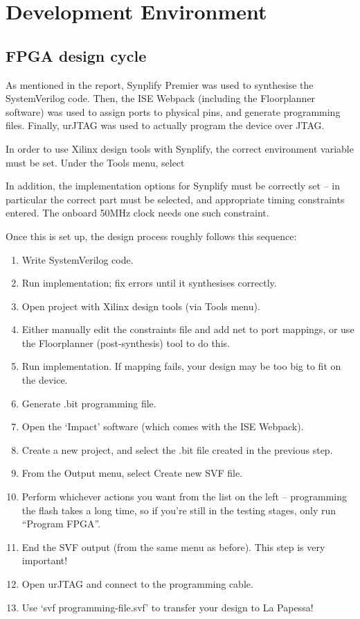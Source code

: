 \chapter{Development Environment} %
\label{apdx:development_environment}


\section{FPGA design cycle} %
\label{apdx:fpga_design_cycle}
	As mentioned in the report, Synplify Premier was used to synthesise the SystemVerilog code.  Then, the ISE Webpack (including the Floorplanner software) was used to assign ports to physical pins, and generate programming files.  Finally, urJTAG was used to actually program the device over JTAG.

	In order to use Xilinx design tools with Synplify, the correct environment variable must be set.  Under the Tools menu, select %

	In addition, the implementation options for Synplify must be correctly set -- in particular the correct part must be selected, and appropriate timing constraints entered.  The onboard 50MHz clock needs one such constraint.

	Once this is set up, the design process roughly follows this sequence:
	\begin{enumerate}
		\item Write SystemVerilog code.
		\item Run implementation; fix errors until it synthesises correctly.
		\item Open project with Xilinx design tools (via Tools menu).
		\item Either manually edit the constraints file and add net to port mappings, or use the Floorplanner (post-synthesis) tool to do this.
		\item Run implementation.  If mapping fails, your design may be too big to fit on the device.
		\item Generate .bit programming file.
		\item Open the `Impact' software (which comes with the ISE Webpack).
		\item Create a new project, and select the .bit file created in the previous step.
		\item From the Output menu, select Create new SVF file.
		\item Perform whichever actions you want from the list on the left -- programming the flash takes a long time, so if you're still in the testing stages, only run ``Program FPGA''.
		\item End the SVF output (from the same menu as before).  This step is very important!
		\item Open urJTAG and connect to the programming cable.
		\item Use `svf programming-file.svf' to transfer your design to La Papessa!
	\end{enumerate}


